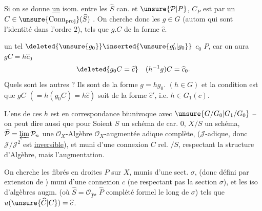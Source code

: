 Si on se donne \uline{un} isom. entre les $\widehat S$ can. et $\unsure{\mathcal P|P}$, $C_P$ est  par un $C\in\unsure{\operatorname{Conn}_{\mathrm{proj}}}(\widehat S)$ . On cherche donc les $g\in G$ (autom  qui sont l'identité dans l'ordre $2$), tels que $g.C$ de la forme $\widehat c$.

   un tel $\deleted{\unsure{g_0}}\inserted{\unsure{g'_0|g_0}}$    $c_0$  $P$, car on aura $gC=h\widehat c_0$
\[
\deleted{g_0C=\widehat c}\quad (h^{-1}g)C=\widehat c_0.
\]
Quels sont les autres ? Ils sont de la forme $g=hg_0$. $(h\in G)$ et la condition est que $gC$ $(=h(g_0C)=h\widehat c)$ soit de la forme $\widehat c'$, i.e. $h\in G_1(c)$.

L'ens de ces $h$ est en correspondance biunivoque avec $\unsure{G/G_0|G_1/G_0}$ -- on peut dire aussi que pour 
\uline{} Soient $S$ un schéma de car. $0$, $X/S$ un schéma, $\widehat{\mathcal P}=\varprojlim\mathcal P_n$ une  $\mathcal O_X$-Algèbre $\mathcal O_X$-augmentée adique complète,  ($\mathcal J$-adique,  donc $\mathcal J/\mathcal J^2$ \deleted{$\unsure{\simeq\Omega}$} est \uline{inversible}), et muni d'une \deleted{$\unsure{\xi}$} connexion  $C$ rel. $/S$, respectant la structure d'Algèbre, mais  l'augmentation.

On cherche les fibrés en droites $P$ sur $X$, munis d'une sect. $\sigma$, (donc défini par extension de 
) muni d'une connexion $c$ (ne respectant pas  la section  $\sigma$),  et les iso d'algèbres augm.
 (où $\widehat S=\mathcal O_{\widehat P}$, $\widehat P$ complété formel le long de $\sigma$) tels que $u(\unsure{\widehat C|C})=\widehat c$.


